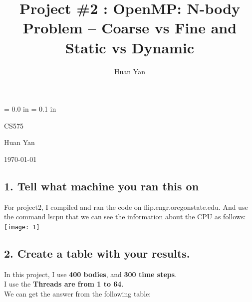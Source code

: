 \documentclass[a4paper,12pt]{article}
\begin{document}
\setlength\parskip{ \baselineskip}
\title{Project \#2 : OpenMP: N-body Problem -- Coarse vs Fine and Static vs Dynamic}
\setlength\parskip{ \baselineskip}
\author{
	Huan Yan
}

\maketitle
\newpage
\renewcommand{\headrulewidth}{1pt}
\renewcommand{\labelitemii}{$\bullet$}
\def\course{CS575}
\def\name{Huan Yan}

\parindent = 0.0 in
\parskip = 0.1 in


\hfill \course


\hfill \name


\hfill \today

\subsection*{ 1. Tell what machine you ran this on}

For project2, I compiled and ran the code on flip.engr.oregonstate.edu.  And use the command lscpu that we can see the information about the CPU as follows:\\

\texttt{[image: 1]}

\subsection*{2. Create a table with your results.}

In this project, I use \textbf{400 bodies}, and \textbf{300 time steps}.\\

I use the \textbf{Threads are from 1 to 64}.\\

We can get the answer from the following table:\\
\end{document}
